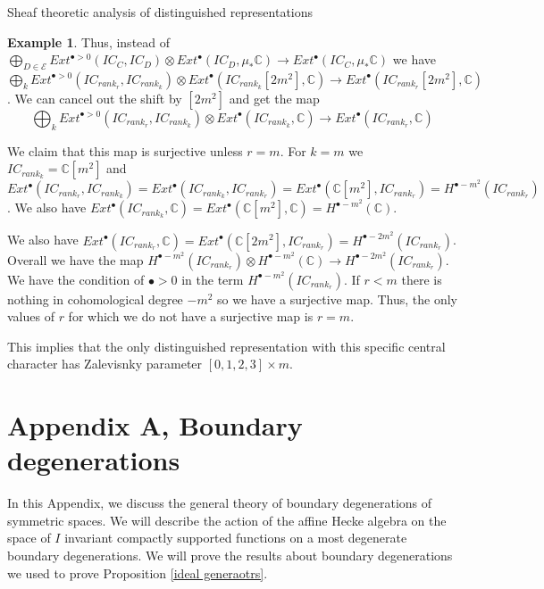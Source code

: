 \documentclass[12pt]{article}
\newcommand{\C}{\mathbb{C}}
\newcommand{\<}{\langle}
\renewcommand{\>}{\rangle}
\theoremstyle{plain}
\theoremstyle{definition}
\newtheorem{exmp}[theorem]{Example}
\begin{document}
\begin{section}{Sheaf theoretic analysis of distinguished representations}
\begin{subsection}
\begin{exmp}
Thus, instead of $\bigoplus_{D\in\mathcal{E}}Ext^{\bullet>0}(IC_C,IC_D)\otimes Ext^\bullet(IC_D,\mu_*\C)\rightarrow Ext^\bullet(IC_C,\mu_*\C)$ we have $\bigoplus_{k}Ext^{\bullet>0}(IC_{rank_r},IC_{rank_k})\otimes Ext^\bullet(IC_{rank_k}[2m^2],\C)\rightarrow Ext^\bullet(IC_{rank_r}[2m^2],\C)$. We can cancel out the shift by $[2m^2]$ and get the map $$\bigoplus_{k}Ext^{\bullet>0}(IC_{rank_r},IC_{rank_k})\otimes Ext^\bullet(IC_{rank_k},\C)\rightarrow Ext^\bullet(IC_{rank_r},\C)$$

We claim that this map is surjective unless $r=m$. For $k=m$ we $IC_{rank_k}=\C[m^2]$ and $Ext^{\bullet}(IC_{rank_r},IC_{rank_k})=Ext^{\bullet}(IC_{rank_k},IC_{rank_r})=Ext^{\bullet}(\C[m^2],IC_{rank_r})=H^{\bullet-m^2}(IC_{rank_r})$. We also have $Ext^\bullet(IC_{rank_k},\C)=Ext^\bullet(\C[m^2],\C)=H^{\bullet-m^2}(\C)$. 

We also have  $Ext^\bullet(IC_{rank_r},\C)=Ext^\bullet(\C[2m^2],IC_{rank_r})=H^{\bullet-2m^2}(IC_{rank_r})$. Overall we have the map  $H^{\bullet-m^2}(IC_{rank_r})\otimes H^{\bullet-m^2}(\C)\rightarrow H^{\bullet-2m^2}(IC_{rank_r})$. We have the condition of $\bullet>0$ in the term $H^{\bullet-m^2}(IC_{rank_r})$. If $r<m$ there is nothing in cohomological degree $-m^2$ so we have a surjective map. Thus, the only values of $r$ for which we do not have a surjective map is $r=m$.  

This implies that the only distinguished representation with this specific central character has Zalevisnky parameter $[0,1,2,3]\times m$. 
\end{exmp}
    








\end{subsection}

    
\end{section}


\newpage

\renewcommand{\C}{\mathcal{C}}



\appendix

\section{Appendix A, Boundary degenerations}\label{A1}

In this Appendix, we discuss the general theory of boundary degenerations of symmetric spaces. We will describe the action of the affine Hecke algebra on the space of $I$ invariant compactly supported functions on a most degenerate boundary degenerations. We will prove the results about boundary degenerations we used to prove Proposition \ref{ideal generaotrs}.
\end{document}
